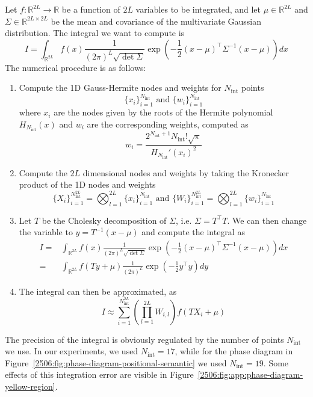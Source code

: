 Let \(f\colon \mathbb{R}^{2L} \to \mathbb{R}\) be a function of \(2L\) variables to be integrated, and let \(\mu\in\mathbb{R}^{2L}\) and \(\Sigma\in\mathbb{R}^{2L\times 2L}\) be the mean and covariance of the multivariate Gaussian distribution. The integral we want to compute is
\begin{equation}
    I=\int_{\mathbb{R}^{2L}} f(x) \frac{1}{(2\pi)^{L}\sqrt{\det \Sigma}} \exp\left(-\frac{1}{2} (x - \mu)^\top \Sigma^{-1} (x - \mu)\right) dx
\end{equation}
The numerical procedure is as follows:
\begin{enumerate}
    \item Compute the 1D Gauss-Hermite nodes and weights for \(N_\mathrm{int}\) points
          \[
            \{x_i\}_{i=1}^{N_\mathrm{int}} \text{ and } \{w_i\}_{i=1}^{N_\mathrm{int}} 
          \]
          where \(x_i\) are the nodes given by the roots of the Hermite polynomial \(H_{N_\mathrm{int}}(x)\) and \(w_i\) are the corresponding weights, computed as
            \[
                w_i = \frac{2^{N_\mathrm{int}+1} N_\mathrm{int}! \sqrt{\pi}}{H_{N_\mathrm{int}}'(x_i)^2}
            \]
    \item Compute the \(2L\) dimensional nodes and weights by taking the Kronecker product of the 1D nodes and weights
          \[
            \{X_i\}_{i=1}^{N_\mathrm{int}^{2L}} = \bigotimes_{l=1}^{2L} \{x_i\}_{i=1}^{N_\mathrm{int}} \text{ and } \{W_i\}_{i=1}^{N_\mathrm{int}^{2L}} = \bigotimes_{l=1}^{2L} \{w_i\}_{i=1}^{N_\mathrm{int}}
          \]
    \item Let \(T\) be the Cholesky decomposition of \(\Sigma\), i.e. \(\Sigma = T^\top T\). We can then change the variable to \(y = T^{-1}(x - \mu)\) and compute the integral as
          \[\begin{split}
            I=&\int_{\mathbb{R}^{2L}} f(x) \frac{1}{(2\pi)^{L}\sqrt{\det \Sigma}} \exp\left(-\frac{1}{2} (x - \mu)^\top \Sigma^{-1} (x - \mu)\right) dx \\=& \int_{\mathbb{R}^{2L}} f(Ty + \mu) \frac{1}{(2\pi)^{L}} \exp\left(-\frac{1}{2} y^\top y\right) dy
          \end{split}\]
    \item The integral can then be approximated, as
          \[
            I \approx \sum_{i=1}^{N_\mathrm{int}^{2L}} \left(\prod_{l=1}^{2L}W_{i,l}\right) f(TX_i + \mu)
          \]
\end{enumerate}
The precision of the integral is obviously regulated by the number of points \(N_\mathrm{int}\) we use. In our experiments, we used \(N_\mathrm{int} = 17\), while for the phase diagram in Figure~\ref{2506:fig:phase-diagram-positional-semantic} we used \(N_\mathrm{int} = 19\). Some effects of this integration error are visible in Figure~\ref{2506:fig:app:phase-diagram-yellow-region}.
